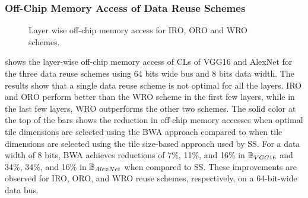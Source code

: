 \subsubsection{Off-Chip Memory Access of Data Reuse  Schemes}\label{sec:ResultsDataReuseScheme}
\begin{figure}[htb]
	\centering
	\hfil
	\hfil	
	\caption{Layer wise off-chip memory access for IRO, ORO and WRO schemes.}
	\label{fig:DataReuseSchemeCompare}
	\vspace{-1.0em}	
\end{figure}
 shows the layer-wise off-chip memory access of CLs of VGG16 and AlexNet for the three data reuse schemes using 64 bits wide bus and 8 bits data width. The results show that a single data reuse scheme is not optimal for all the layers. IRO and ORO perform better than the WRO scheme in the first few layers, while in the last few layers, WRO outperforms the other two schemes. The solid color at the top of the bars shows the reduction in off-chip memory accesses when optimal tile dimensions are selected using the BWA approach compared to when tile dimensions are selected using the tile size-based approach used by SS. For a data width of 8 bits, BWA achieves reductions of 7\%, 11\%, and 16\% in $\mathbb{B}_{VGG16}$ and 34\%, 34\%, and 16\% in $\mathbb{B}_{AlexNet}$ when compared to SS. These improvements are observed for IRO, ORO, and WRO reuse schemes, respectively, on a 64-bit-wide data bus.

